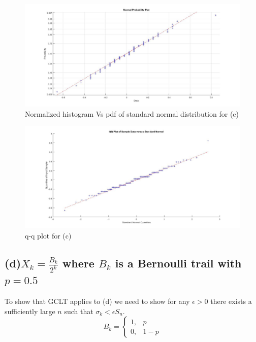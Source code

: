 \documentclass[a4paper,11pt]{article}
\begin{document}
\begin{figure}[h]
   \hspace*{-4cm}
    \includegraphics[scale=0.4]{q2_c_1}
    \caption{Normalized histogram Vs pdf of standard normal distribution for (c)}\label{fig:q2_c_1}
\end{figure}
\begin{figure}[h]
   \hspace*{-4cm}
    \includegraphics[scale=0.4]{q2_c_2}
    \caption{q-q plot for (c)}\label{fig:q2_c_2}
\end{figure}
\newpage
\clearpage
\subsection*{(d)\quad $X_k=\frac{B_k}{2^k}$  where $B_k$ is a Bernoulli trail with $p=0.5$}
To show that GCLT applies to (d) we need to show for any $\epsilon>0$ there exists a sufficiently large $n$ such that $\sigma_k < \epsilon S_n$.
\[
    B_k= 
\begin{cases}
    1              ,&  p\\
    0 ,             &  1-p
\end{cases}
\]
\end{document}

